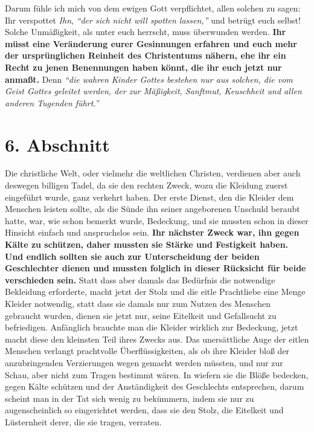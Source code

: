 \medskip

Darum fühle ich mich von dem ewigen Gott verpflichtet, allen solchen zu sagen:
Ihr verspottet \textit{Ihn},
\textit{"`der sich nicht will spotten lassen,"'}
und betrügt euch selbst! Solche Unmäßigkeit, als unter
euch herrscht, muss
überwunden werden.
\label{ref:14_06_wahre_nachfolger_umkehr}
\textbf{Ihr müsst eine Veränderung eurer Gesinnungen erfahren und euch
mehr der ursprünglichen Reinheit des Christentums nähern, ehe ihr ein Recht zu
jenen Benennungen haben könnt, die ihr euch jetzt nur anmaßt.}
 Denn
\textit{"`die wahren
Kinder Gottes bestehen nur aus solchen, die vom Geist Gottes geleitet werden,
der zur Mäßigkeit, Sanftmut, Keuschheit und allen anderen Tugenden
führt."'}

\section{6. Abschnitt} \label{kap14_ab6}

Die christliche Welt, oder vielmehr die weltlichen
Christen,
verdienen aber auch
deswegen billigen Tadel, da sie den rechten Zweck, wozu die Kleidung zuerst
eingeführt wurde, ganz verkehrt haben. Der erste Dienst, den die Kleider dem
Menschen leisten sollte, als die Sünde ihn seiner angeborenen Unschuld beraubt
hatte, war, wie schon bemerkt wurde, Bedeckung, und sie mussten schon in dieser
Hinsicht einfach und anspruchslos sein. \textbf{Ihr nächster Zweck war, ihn
gegen Kälte
zu schützen, daher mussten sie Stärke und Festigkeit haben. Und endlich sollten
sie auch zur Unterscheidung der beiden Geschlechter dienen und mussten folglich
in dieser Rücksicht für beide verschieden sein.} Statt dass aber
damals das
Bedürfnis die notwendige Bekleidung erforderte, macht jetzt der Stolz und die
eitle Prachtliebe eine Menge Kleider notwendig, statt dass sie damals nur zum
Nutzen des Menschen gebraucht wurden, dienen sie jetzt nur, seine
Eitelkeit und
Gefallsucht zu befriedigen. Anfänglich brauchte man die Kleider wirklich zur
Bedeckung, jetzt macht diese den kleinsten Teil ihres Zwecks aus. Das
unersättliche Auge der eitlen Menschen verlangt prachtvolle Überflüssigkeiten,
als ob ihre Kleider bloß der anzubringenden Verzierungen wegen gemacht werden
müssten, und nur zur Schau, aber nicht zum Tragen bestimmt wären. In wiefern sie
die Blöße bedecken, gegen Kälte schützen und der Anständigkeit des Geschlechts
entsprechen, darum scheint man in der Tat sich wenig zu bekümmern, indem
sie nur zu augenscheinlich so eingerichtet werden, dass sie den Stolz, die
Eitelkeit und Lüsternheit derer, die sie tragen, verraten.

